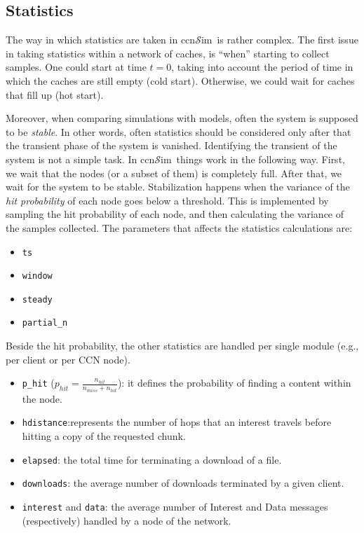 \documentclass{article}
\newcommand{\ccnsim}{ccn$\mathcal{S}$im}
\begin{document}
\subsection{Statistics}
The way in which statistics are taken in \ccnsim\ is rather complex. The first issue in taking statistics within a network of caches, is ``when'' starting to collect samples. One could start at time $t = 0$, taking  into account the period of time in which the caches are still empty (cold start). Otherwise, we could wait for caches that fill up (hot start). 

Moreover, when comparing simulations with models, often the system is supposed to be \emph{stable}. In other words, often statistics should be considered only after that the transient phase of the system is vanished. Identifying the transient of the system is not a simple task. In \ccnsim\ things work in the following way. First, we wait that the nodes (or a subset of them) is completely full. After that, we wait for the system to be stable. Stabilization happens when the variance of the \emph{hit probability} of each node goes below a threshold. This is implemented by sampling the hit probability of each node, and then calculating the variance of the samples collected.  The parameters that affects the statistics calculations are:
\begin{itemize}
    \item \verb|ts|
    \item \verb|window|
    \item \verb|steady|
    \item \verb|partial_n|
\end{itemize}
Beside the hit probability, the other statistics are handled per single module (e.g., per client or per CCN node). 
\begin{itemize}
    \item \verb|p_hit|  ($p_{hit} = \frac{n_{hit}}{n_{miss}+n_{hit}}$): it defines the probability of finding a content within the node.
    \item \verb|hdistance|:represents the number of hops that an interest travels before hitting a copy of the requested chunk.
    \item \verb|elapsed|: the total time for terminating a download of a file.
    \item \verb|downloads|: the average number of downloads terminated by a given client.
    \item \verb|interest| and \verb|data|: the average number of Interest and Data messages (respectively) handled by a node of the network. 
\end{itemize}
\end{document}
